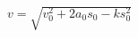 \documentclass[border=2.5pt]{standalone}
\begin{document}
$\displaystyle \boxed{v=\sqrt{v_0^2+2a_0s_0-ks_0^2}}$
\end{document}

